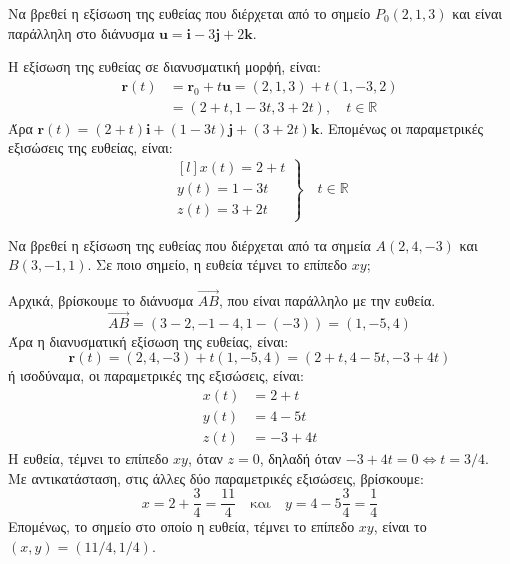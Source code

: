 \begin{example}
  Να βρεθεί η εξίσωση της ευθείας που διέρχεται από το σημείο $ P_{0}(2,1,3) $ 
  και είναι παράλληλη στο διάνυσμα 
  $ \mathbf{u} = \mathbf{i}- 3 \mathbf{j}+2 \mathbf{k} $.
\end{example}
\begin{solution}
  Η εξίσωση της ευθείας σε διανυσματική μορϕή, είναι:
  \begin{align*}
    \mathbf{r}(t) &= \mathbf{r}_{0} + t \mathbf{u} = (2,1,3) + t(1,-3,2) \\
                  &= (2+t,1-3t,3+2t), \quad t \in \mathbb{R}
  \end{align*} 
  Άρα $ \mathbf{r}(t) = (2+t) \mathbf{i} + (1-3t) \mathbf{j} + (3+2t) \mathbf{k} $. 
  Επομένως οι παραμετρικές εξισώσεις της ευθείας, είναι:
  \[
    \left.
      \begin{matrix*}[l]
        x(t) = 2+t \\
        y(t) = 1-3t \\
        z(t) = 3+2t
      \end{matrix*} 
    \right\} \quad  t \in \mathbb{R} 
  \]
\end{solution}

\begin{example}\label{ex:line2}
  Να βρεθεί η εξίσωση της ευθείας που διέρχεται από τα σημεία $ Α(2,4,-3) $ και 
  $ B(3,-1,1) $. Σε ποιο σημείο, η ευθεία τέμνει το επίπεδο $ xy $; 
\end{example}
\begin{solution}
  Αρχικά, βρίσκουμε το διάνυσμα $ \vec{AB} $, που είναι παράλληλο με την ευθεία.
  \[ \vec{AB} = (3-2,-1-4,1-(-3)) = (1,-5,4) \]
  Άρα η διανυσματική εξίσωση της ευθείας, είναι:
  \[
    \mathbf{r}(t) = (2,4,-3) + t(1,-5,4) = (2+t,4-5t,-3+4t)
  \] 
  ή ισοδύναμα, οι παραμετρικές της εξισώσεις, είναι:
  \begin{align*}
    x(t) &= 2+t \\
    y(t) &= 4-5t \\
    z(t) &= -3+4t
  \end{align*} 
  Η ευθεία, τέμνει το επίπεδο $ xy $, όταν $ z=0 $, δηλαδή όταν $ -3+4t=0
  \Leftrightarrow t = 3/4 $. Με αντικατάσταση, στις άλλες δύο παραμετρικές εξισώσεις, 
  βρίσκουμε:
  \[
    x = 2+ \frac{3}{4} = \frac{11}{4} \quad \text{και} \quad y = 4- 5\frac{3}{4} = 
    \frac{1}{4}  
  \]
  Επομένως, το σημείο στο οποίο η ευθεία, τέμνει το επίπεδο $ xy $, είναι το 
  $ (x,y) = (11/4,1/4) $.
\end{solution}

